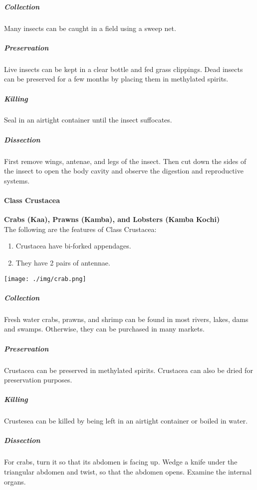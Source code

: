 \begin{multicols}{2}
\subparagraph{Collection}
Many insects can be caught in a field using a sweep net. 

\subparagraph{Preservation} 
Live insects can be kept in a clear bottle and fed grass clippings. Dead insects can be preserved for a few months by placing them in methylated spirits.

\subparagraph{Killing}
Seal in an airtight container until the insect suffocates.

\subparagraph{Dissection}
First remove wings, antenae, and legs of the insect. Then cut down the sides of the insect to open the body cavity and observe the digestion and reproductive systems.
	
\paragraph{Class Crustacea}
\textbf{Crabs (Kaa), Prawns (Kamba), and Lobsters (Kamba Kochi)}\\
The following are the features of Class Crustacea:
\begin{enumerate}
\item{Crustacea have bi-forked appendages.}
\item{They have 2 pairs of antennae.}
\end{enumerate}

\begin{center}
\texttt{[image: ./img/crab.png]}
\end{center}

%

\subparagraph{Collection}
Fresh water crabs, prawns, and shrimp can be found in most rivers, lakes, dams and swamps. Otherwise, they can be purchased in many markets.


\subparagraph{Preservation} 
Crustacea can be preserved in methylated spirits. Crustacea can also be dried for preservation purposes.

\subparagraph{Killing}
Crustesea can be killed by being left in an airtight container or boiled in water.

\subparagraph{Dissection}
For crabs, turn it so that its abdomen is facing up. Wedge a knife under the triangular abdomen and twist, so that the abdomen opens. Examine the internal organs.
		

\end{multicols}
